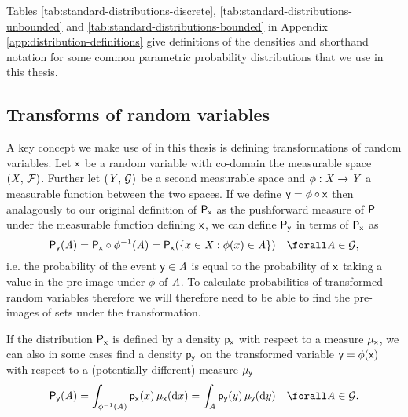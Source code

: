 Tables \ref{tab:standard-distributions-discrete}, \ref{tab:standard-distributions-unbounded} and \ref{tab:standard-distributions-bounded} in Appendix \ref{app:distribution-definitions} give definitions of the densities and shorthand notation for some common parametric probability distributions that we use in this thesis.

\subsection{Transforms of random variables}\label{subsec:change-of-variables}

A key concept we make use of in this thesis is defining transformations of random variables. Let $\mathsf{x}$ be a random variable with co-domain the measurable space $(\mathit{X},\,\mathcal{F})$. Further let $(\mathit{Y},\,\mathcal{G})$ be a second measurable space and $\phi : \mathit{X} \to \mathit{Y}$ a measurable function between the two spaces. If we define $\mathsf{y} = \phi \circ \mathsf{x}$ then analagously to our original definition of $\mathsf{P}_{\mathsf{x}}$ as the pushforward measure of $\mathsf{P}$ under the measurable function defining $\mathsf{x}$, we can define $\mathsf{P}_{\mathsf{y}}$ in terms of $\mathsf{P}_{\mathsf{x}}$ as
\begin{equation}\label{eq:change-of-variables-probability}
  \prob{\rvar{y}}(\set{A}) = 
  \prob{\rvar{x}} \circ \phi^{-1}(\set{A}) =
  \prob{\rvar{x}}\lpa \lbrace x \in \set{X} : \phi(x) \in \set{A} \rbrace \rpa
  \quad \forall \set{A} \in \sset{G},
\end{equation}
i.e. the probability of the event $\mathsf{y} \in \mathit{A}$ is equal to the probability of $\mathsf{x}$ taking a value in the pre-image under $\phi$ of $\mathit{A}$. To calculate probabilities of transformed random variables therefore we will therefore need to be able to find the pre-images of sets under the transformation.

If the distribution $\mathsf{P}_{\mathsf{x}}$ is defined by a density $\mathsf{p}_{\mathsf{x}}$ with respect to a measure $\mu_{\mathsf{x}}$, we can also in some cases find a density $\mathsf{p}_{\mathsf{y}}$ on the transformed variable $\mathsf{y} = \phi(\mathsf{x})$ with respect to a (potentially different) measure $\mu_{\mathsf{y}}$
\begin{equation}\label{eq:change-of-variables-general}
  \prob{\rvar{y}}(\set{A}) =
  \int_{\phi^{-1}(\set{A})} \pden{\rvar{x}}(x) \,\mu_{\rvar{x}}(\dr x) = 
  \int_{\set{A}} \pden{\rvar{y}}(y) \,\mu_{\rvar{y}}(\dr y)
  \quad \forall \set{A} \in \sset{G}.
\end{equation}

